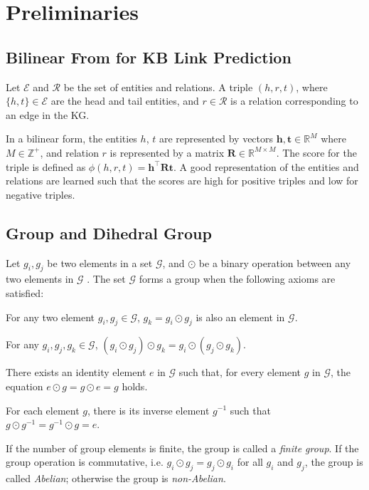 \documentclass[11pt,a4paper]{article}
\begin{document}
%
 \section{Preliminaries}\label{sec:preliminary}



\subsection{Bilinear From for KB Link Prediction} \label{subsec:bilinear}

Let $\mathcal{E}$ and $\mathcal{R}$ be the set of entities and relations. A triple $(h, r, t)$, where $\{h, t\}\in \mathcal{E}$ are the head and tail entities, and $r \in \mathcal{R}$ is a relation corresponding to an edge in the KG. 

In a bilinear form, the entities $h$, $t$ are represented by vectors $\bm{h}, \bm{t}\in\mathbb{R}^M$ where $M \in \mathbb{Z}^{+}$, and relation $r$ is represented by a matrix $\bm{R}\in\mathbb{R}^{M\times M}$. The score for the triple is defined as $\phi(h, r, t) = \bm{h}^\top {\bm{R}} \bm{t}$. A good representation of the entities and relations are learned such that the scores are high for positive triples and low for negative triples.






\subsection{Group and Dihedral Group}


Let $g_i, g_j$ be two elements in a set $\mathcal{G}$, and $\odot$ be a binary operation  between any two elements  in $\mathcal{G}$ . The set $\mathcal{G}$ forms a group when the following axioms are satisfied:
\begin{description}[leftmargin=0cm]
\item[Closure] For any two element $g_i, g_j \in \mathcal{G}$, $g_k = g_i \odot g_j$ is also an element in $\mathcal{G}$.
\item[Associativity] For any $g_i, g_j, g_k \in \mathcal{G}$, $(g_i \odot g_j) \odot g_k = g_i \odot (g_j \odot g_k)$.
\item[Identity] There exists an identity element $e$ in $\mathcal{G}$ such that, for every element $g$ in $\mathcal{G}$, the equation $e \odot g = g \odot e = g$ holds.
\item[Inverse] For each element $g$, there is its inverse element $g^{-1}$ such that $g \odot g^{-1} = g^{-1} \odot g = e$.
\end{description}
If the number of group elements is finite, the group is called a \textit{finite group}. If the group operation is commutative, i.e. $g_i \odot g_j = g_j \odot g_i$ for all $g_i$ and $g_j$, the group is called \textit{Abelian}; otherwise the group is \textit{non-Abelian}. 
\end{document}
